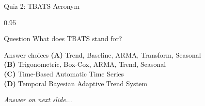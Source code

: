 \documentclass[9pt, aspectratio=169, t]{beamer}
\begin{document}
\begin{frame}{Quiz 2: TBATS Acronym}
    \begin{cminipage}{0.95\textwidth}
    \begin{alertblock}{Question}
        What does TBATS stand for?
    \end{alertblock}

    \vspace{0.4cm}

    \begin{block}{Answer choices}
        \textcolor{MainBlue}{\textbf{(A)}} Trend, Baseline, ARMA, Transform, Seasonal\\[3pt]
        \textcolor{MainBlue}{\textbf{(B)}} Trigonometric, Box-Cox, ARMA, Trend, Seasonal\\[3pt]
        \textcolor{MainBlue}{\textbf{(C)}} Time-Based Automatic Time Series\\[3pt]
        \textcolor{MainBlue}{\textbf{(D)}} Temporal Bayesian Adaptive Trend System
    \end{block}

    \vspace{0.5cm}

    \begin{center}
        \textit{Answer on next slide...}
    \end{center}
    \end{cminipage}
\end{frame}
\end{document}
